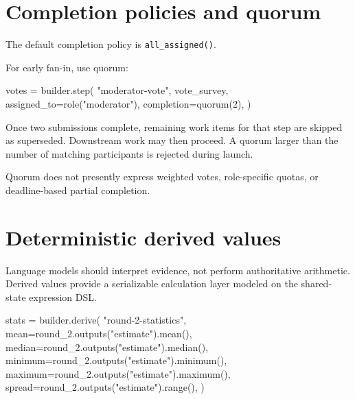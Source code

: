\documentclass[
  10pt,
]{report}
\newenvironment{Shaded}{}{}
\newcommand{\BuiltInTok}[1]{\textcolor[rgb]{0.00,0.50,0.00}{#1}}
\newcommand{\DecValTok}[1]{\textcolor[rgb]{0.25,0.63,0.44}{#1}}
\newcommand{\NormalTok}[1]{#1}
\newcommand{\OperatorTok}[1]{\textcolor[rgb]{0.40,0.40,0.40}{#1}}
\newcommand{\StringTok}[1]{\textcolor[rgb]{0.25,0.44,0.63}{#1}}
\begin{document}
\chapter{Completion policies and
quorum}\label{completion-policies-and-quorum}

The default completion policy is \texttt{all\_assigned()}.

For early fan-in, use quorum:

\begin{Shaded}
\begin{Highlighting}[]
\NormalTok{votes }\OperatorTok{=}\NormalTok{ builder.step(}
    \StringTok{"moderator{-}vote"}\NormalTok{,}
\NormalTok{    vote\_survey,}
\NormalTok{    assigned\_to}\OperatorTok{=}\NormalTok{role(}\StringTok{"moderator"}\NormalTok{),}
\NormalTok{    completion}\OperatorTok{=}\NormalTok{quorum(}\DecValTok{2}\NormalTok{),}
\NormalTok{)}
\end{Highlighting}
\end{Shaded}

Once two submissions complete, remaining work items for that step are
skipped as superseded. Downstream work may then proceed. A quorum larger
than the number of matching participants is rejected during launch.

Quorum does not presently express weighted votes, role-specific quotas,
or deadline-based partial completion.

\chapter{Deterministic derived
values}\label{deterministic-derived-values}

Language models should interpret evidence, not perform authoritative
arithmetic. Derived values provide a serializable calculation layer
modeled on the shared-state expression DSL.

\begin{Shaded}
\begin{Highlighting}[]
\NormalTok{stats }\OperatorTok{=}\NormalTok{ builder.derive(}
    \StringTok{"round{-}2{-}statistics"}\NormalTok{,}
\NormalTok{    mean}\OperatorTok{=}\NormalTok{round\_2.outputs(}\StringTok{"estimate"}\NormalTok{).mean(),}
\NormalTok{    median}\OperatorTok{=}\NormalTok{round\_2.outputs(}\StringTok{"estimate"}\NormalTok{).median(),}
\NormalTok{    minimum}\OperatorTok{=}\NormalTok{round\_2.outputs(}\StringTok{"estimate"}\NormalTok{).minimum(),}
\NormalTok{    maximum}\OperatorTok{=}\NormalTok{round\_2.outputs(}\StringTok{"estimate"}\NormalTok{).maximum(),}
\NormalTok{    spread}\OperatorTok{=}\NormalTok{round\_2.outputs(}\StringTok{"estimate"}\NormalTok{).}\BuiltInTok{range}\NormalTok{(),}
\NormalTok{)}
\end{Highlighting}
\end{Shaded}
\end{document}
